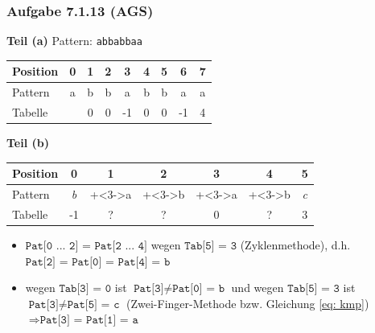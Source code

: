 \documentclass{beamer}
\begin{document}
\begin{frame}[t] \frametitle{Aufgabe 7.1.13 (AGS) \hfill {}}
	\textbf{Teil (a)} \hspace{3em}
	Pattern: {\large \texttt{abbabbaa}} \\[1em]
	
	\begin{center}
		\renewcommand*{\arraystretch}{1.1} \setlength{\tabcolsep}{10pt}
		\begin{tabular}{l|cccccccc}
			Position &  0 &  1 &  2 &  3 &  4 &  5 &  6 &  7  \\ \hline
			Pattern  &  a &  b &  b &  a &  b &  b &  a &  a  \\ \hline
			Tabelle  & \only<2->{ -1 &  0 &  0 & -1 &  0 &  0 & -1 &  4 } \\
		\end{tabular}
	\end{center}
	
	\pause
	
	\textbf{Teil (b)}
	\vspace{-1.5\baselineskip}
	\begin{center}
		\renewcommand*{\arraystretch}{1.1} \setlength{\tabcolsep}{16pt}
		\begin{tabular}{l|cccccc}
			Position &  0 &  1 &  2 &  3 &  4 &  5 \\ \hline
			Pattern  &  \textit{b} &  \onslide+<3->{a} &  \onslide+<3->{b} &  \onslide+<3->{a} &  \onslide+<3->{b} &  \textit{c} \\ \hline
			Tabelle  & -1 &  ? & ? &  0 &  ? &  3 \\
		\end{tabular}
	\end{center}
	
	\pause
	
	\footnotesize
	\begin{itemize}[<3->]
		\item $\texttt{Pat[0 ... 2] = Pat[2 ... 4]}$ wegen $\texttt{Tab[5] = 3}$ (Zyklenmethode), d.h. $\texttt{Pat[2] = Pat[0] = Pat[4] = b}$
		\item wegen $\texttt{Tab[3] = 0}$ ist $\texttt{Pat[3]} \neq  \texttt{Pat[0] = b}$ und wegen $\texttt{Tab[5] = 3}$ ist $\texttt{Pat[3]} \neq \texttt{Pat[5] = c}$ (Zwei-Finger-Methode bzw. Gleichung \eqref{eq: kmp}) \\
		$\Rightarrow \texttt{Pat[3] = Pat[1] = a}$
	\end{itemize}
\end{frame}
\end{document}
